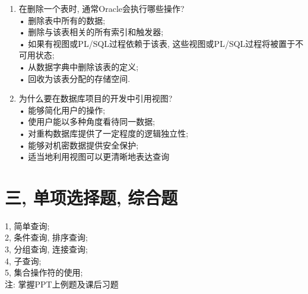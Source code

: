 \documentclass{article}                     %
\numberwithin{equation}{section}            %
\numberwithin{figure}{section}              %
\numberwithin{table}{section}               %
\begin{document}
\begin{enumerate}
\item 在删除一个表时, 通常Oracle会执行哪些操作? \\
• 删除表中所有的数据; \\
• 删除与该表相关的所有索引和触发器; \\
• 如果有视图或PL/SQL过程依赖于该表, 这些视图或PL/SQL过程将被置于不可用状态; \\
• 从数据字典中删除该表的定义; \\
• 回收为该表分配的存储空间. \\





\item 为什么要在数据库项目的开发中引用视图?\\
• 能够简化用户的操作; \\
• 使用户能以多种角度看待同一数据; \\
• 对重构数据库提供了一定程度的逻辑独立性; \\
• 能够对机密数据提供安全保护; \\
• 适当地利用视图可以更清晰地表达查询\\

\end{enumerate}




\section{三, 单项选择题, 综合题}
1, 简单查询; \\
2, 条件查询, 排序查询; \\
3, 分组查询, 连接查询; \\
4, 子查询; \\
5, 集合操作符的使用; \\
注: 掌握PPT上例题及课后习题\\
\end{document}
